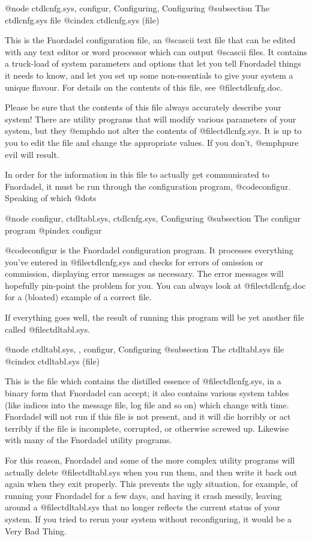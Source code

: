 @node ctdlcnfg.sys, configur, Configuring, Configuring
@subsection The ctdlcnfg.sys file
@cindex ctdlcnfg.sys (file)

This is the Fnordadel configuration file, an @sc{ascii}
text file that can be edited with any text editor or word
processor which can output @sc{ascii} files.  It contains a truck-load
of system parameters and options that let you tell
Fnordadel things it needs to know, and let you set up some
non-essentials to give your system a unique flavour.  For
details on the contents of this file, see @file{ctdlcnfg.doc}.

Please be sure that the contents of this file always
accurately describe your system!  There are utility programs
that will modify various parameters of your system, but they
@emph{do not} alter the contents of @file{ctdlcnfg.sys}.  It is up to you to
edit the file and change the appropriate values.  If you don't,
@emph{pure evil} will result.

In order for the information in this file to actually
get communicated to Fnordadel, it must be run through the
configuration program, @code{configur}.  Speaking of which @dots{}

@node configur, ctdltabl.sys, ctdlcnfg.sys, Configuring
@subsection The configur program
@pindex configur

@code{configur} is the Fnordadel configuration program.  It
processes everything you've entered in @file{ctdlcnfg.sys} and
checks for errors of omission or commission, displaying
error messages as necessary.  The error messages will hopefully
pin-point the problem for you.  You can always look
at @file{ctdlcnfg.doc} for a (bloated) example of a correct file.

If everything goes well, the result of running this
program will be yet another file called @file{ctdltabl.sys}.

@node ctdltabl.sys,  , configur, Configuring
@subsection The ctdltabl.sys file
@cindex ctdltabl.sys (file)

This is the file which contains the distilled
essence of @file{ctdlcnfg.sys}, in a binary form that Fnordadel can
accept; it also contains various system tables (like indices
into the message file, log file and so on) which change with
time.  Fnordadel will not run if this file is not present,
and it will die horribly or act terribly if the file is
incomplete, corrupted, or otherwise screwed up.  Likewise with
many of the Fnordadel utility programs.

For this reason, Fnordadel and some of the more
complex utility programs will actually delete @file{ctdltabl.sys}
when you run them, and then write it back out again when they
exit properly. This prevents the ugly situation, for example,
of running your Fnordadel for a few days, and having it
crash messily, leaving around a @file{ctdltabl.sys} that no longer
reflects the current status of your system.  If you tried to
rerun your system without reconfiguring, it would be a Very
Bad Thing.

